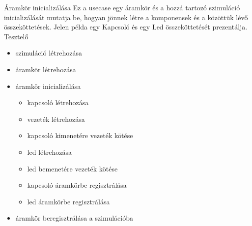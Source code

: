 \usecase
{Áramkör inicializálása}
{Ez a usecase egy áramkör és a hozzá tartozó szimuláció inicializálását mutatja be, hogyan jönnek létre a komponensek és a közöttük lévő összeköttetések. Jelen példa egy Kapcsoló és egy Led összeköttetését prezentálja.}
{Tesztelő}
{\vspace{-15pt}
\begin{itemize}
\setlength{\itemsep}{0cm}%
\setlength{\parskip}{0cm}%
\item szimuláció létrehozása
\item áramkör létrehozása
\item áramkör inicializálása
\begin{itemize}
\setlength{\itemsep}{0cm}%
\setlength{\parskip}{0cm}%
	\item kapcsoló létrehozása
	\item vezeték létrehozása
	\item kapcsoló kimenetére vezeték kötése
	\item led létrehozása
	\item led bemenetére vezeték kötése
	\item kapcsoló áramkörbe regisztrálása
	\item led áramkörbe regisztrálása
\end{itemize}
\item áramkör beregisztrálása a szimulációba
\end{itemize}
\vspace{-15pt}}

\newpage

